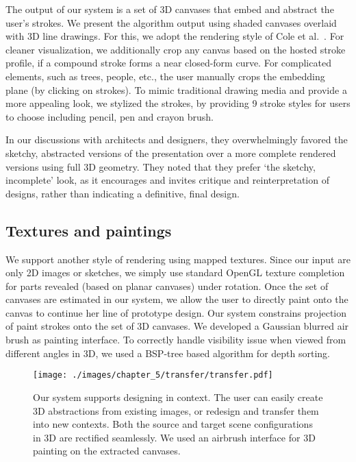 The output of our system is a set of 3D canvases that embed and abstract the user's strokes.
We present the algorithm output using shaded canvases overlaid with 3D line drawings. For this, we adopt the rendering style of Cole et al.~\cite{Cole:2008:PDL}.  For cleaner visualization, we additionally crop any canvas based on the hosted stroke profile, if a compound stroke forms a near closed-form curve. For complicated elements, such as trees, people, etc., the user manually crops the embedding plane (by clicking on strokes).  To mimic traditional drawing media and provide a more appealing look, we stylized the strokes, by providing 9 stroke styles for users to choose including pencil, pen and crayon brush.

In our discussions with architects and designers, they overwhelmingly favored the sketchy, abstracted versions of the presentation over a more complete rendered versions using full 3D geometry. They noted that they prefer `the sketchy, incomplete' look, as it encourages and invites critique and reinterpretation of designs, rather than indicating a definitive, final design.



\subsection{Textures and paintings}

We support another style of rendering using mapped textures. Since our input are only 2{D} images or sketches, we simply use standard OpenGL texture completion for parts revealed (based on planar canvases) under rotation. Once the set of canvases are estimated in our system, we allow the user to directly paint onto the canvas to continue her line of prototype design. Our system constrains projection of paint strokes onto the set of 3{D} canvases. We developed a Gaussian blurred air brush as painting interface. To correctly handle visibility issue when viewed from different angles in 3{D}, we used a BSP-tree based algorithm for depth sorting.

\begin{figure}[t!]
  \texttt{[image: ./images/chapter\_5/transfer/transfer.pdf]}
  \caption[Context transfer.]{Our system supports designing in context. The user can easily create 3{D} abstractions from existing images, or redesign and transfer them into new contexts. Both the source and target scene configurations in 3{D} are rectified seamlessly. We used an airbrush interface for 3{D} painting on the extracted canvases.
  \label{fig:transfer}
  }
\end{figure}

